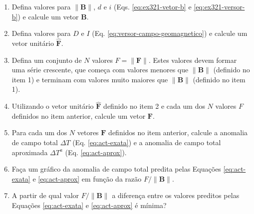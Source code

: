 \documentclass[10pt,a4paper,fleqn]{article}
\begin{document}
\begin{enumerate}

\item Defina valores para $\| \mathbf{B} \|$, $d$ e $i$ (Eqs. \ref{eq:ex321-vetor-b} 
      e \ref{eq:ex321-versor-b}) e calcule um vetor $\mathbf{B}$.

\item Defina valores para $D$ e $I$ (Eq. \ref{eq:versor-campo-geomagnetico}) e calcule
      um vetor unit\'{a}rio $\hat{\mathbf{F}}$.

\item Defina um conjunto de $N$ valores $F = \| \mathbf{F} \|$.
      Estes valores devem formar uma s\'{e}rie crescente, que começa com valores menores
      que $\| \mathbf{B} \|$ (definido no item 1) e terminam com valores muito maiores
      que $\| \mathbf{B} \|$ (definido no item 1).
      
\item Utilizando o vetor unit\'{a}rio $\hat{\mathbf{F}}$ definido no item 2 e cada um 
      dos $N$ valores $F$ definidos no item anterior, calcule um vetor $\mathbf{F}$.
      
\item Para cada um dos $N$ vetores $\mathbf{F}$ definidos no item anterior, calcule a
      anomalia de campo total $\Delta T$ (Eq. \ref{eq:act-exata}) e a anomalia de campo 
      total aproximada $\Delta T^{a}$ (Eq. \ref{eq:act-aprox}).
      
\item Faça um gr\'{a}fico da anomalia de campo total predita pelas Equaç\~{o}es \ref{eq:act-exata}
      e \ref{eq:act-aprox} em funç\~{a}o da razão $F/\| \mathbf{B} \|$.

\item A partir de qual valor $F/\| \mathbf{B} \|$ a diferença entre os valores preditos
      pelas Equaç\~{o}es \ref{eq:act-exata} e \ref{eq:act-aprox} é m\'{i}nima?

\end{enumerate}


\begin{flushleft}
\dotfill
\end{flushleft}

\bigskip
\bigskip
\end{document}
